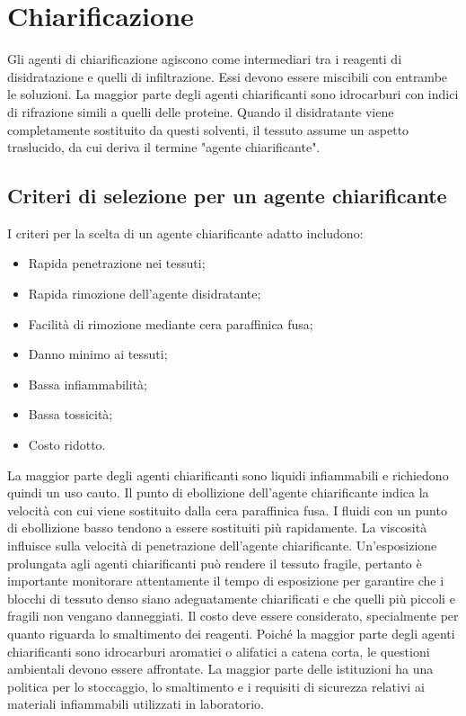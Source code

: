 \section{Chiarificazione}

Gli agenti di chiarificazione agiscono come intermediari tra i reagenti di disidratazione e quelli di infiltrazione. Essi devono essere miscibili con entrambe le soluzioni. La maggior parte degli agenti chiarificanti sono idrocarburi con indici di rifrazione simili a quelli delle proteine. Quando il disidratante viene completamente sostituito da questi solventi, il tessuto assume un aspetto traslucido, da cui deriva il termine "agente chiarificante".

\subsection{Criteri di selezione per un agente chiarificante}
I criteri per la scelta di un agente chiarificante adatto includono:
\begin{itemize}
    \item Rapida penetrazione nei tessuti;
    \item Rapida rimozione dell'agente disidratante;
    \item Facilità di rimozione mediante cera paraffinica fusa;
    \item Danno minimo ai tessuti;
    \item Bassa infiammabilità;
    \item Bassa tossicità;
    \item Costo ridotto.
\end{itemize}

La maggior parte degli agenti chiarificanti sono liquidi infiammabili e richiedono quindi un uso cauto. Il punto di ebollizione dell'agente chiarificante indica la velocità con cui viene sostituito dalla cera paraffinica fusa. I fluidi con un punto di ebollizione basso tendono a essere sostituiti più rapidamente. La viscosità influisce sulla velocità di penetrazione dell'agente chiarificante. Un'esposizione prolungata agli agenti chiarificanti può rendere il tessuto fragile, pertanto è importante monitorare attentamente il tempo di esposizione per garantire che i blocchi di tessuto denso siano adeguatamente chiarificati e che quelli più piccoli e fragili non vengano danneggiati. Il costo deve essere considerato, specialmente per quanto riguarda lo smaltimento dei reagenti. Poiché la maggior parte degli agenti chiarificanti sono idrocarburi aromatici o alifatici a catena corta, le questioni ambientali devono essere affrontate. La maggior parte delle istituzioni ha una politica per lo stoccaggio, lo smaltimento e i requisiti di sicurezza relativi ai materiali infiammabili utilizzati in laboratorio.

